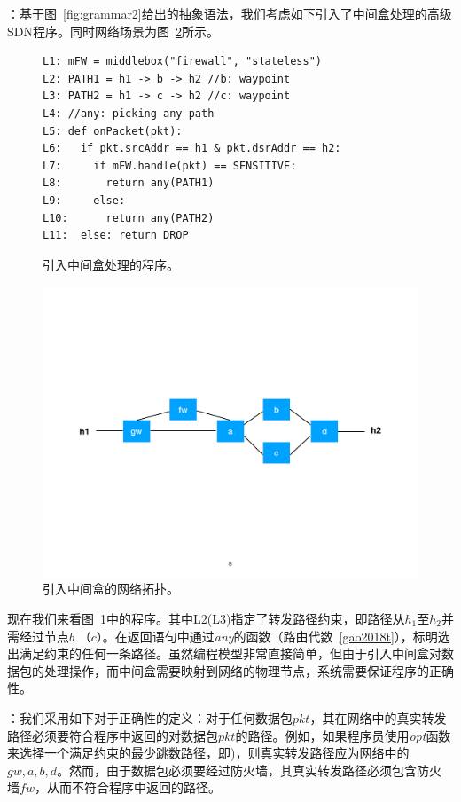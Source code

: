 ：基于图~\ref{fig:grammar2}给出的抽象语法，我们考虑如下引入了中间盒处理的高级SDN程序。同时网络场景为图~\ref{fig:topo2}所示。

\begin{figure}[h]
\begin{verbatim}
L1: mFW = middlebox("firewall", "stateless")
L2: PATH1 = h1 -> b -> h2 //b: waypoint
L3: PATH2 = h1 -> c -> h2 //c: waypoint
L4: //any: picking any path
L5: def onPacket(pkt):
L6:   if pkt.srcAddr == h1 & pkt.dsrAddr == h2:
L7:     if mFW.handle(pkt) == SENSITIVE:
L8:       return any(PATH1)
L9:     else:
L10:      return any(PATH2)
L11:  else: return DROP
\end{verbatim}
    \caption{\small 引入中间盒处理的程序。}
\label{fig:code2}
\end{figure}


\begin{figure}[!htbp]
\includegraphics[width=0.8\linewidth]{figures/global-topo2.pdf}
\centering
\caption{\small 引入中间盒的网络拓扑。}
\label{fig:topo2}
\end{figure}

现在我们来看图~\ref{fig:code2}中的程序。其中L2(L3)指定了转发路径约束，即路径从$h_1$至$h_2$并需经过节点$b$ （$c$）。在返回语句中通过\emph{any}的函数（路由代数~\ref{gao2018t}），标明选出满足约束的任何一条路径。虽然编程模型非常直接简单，但由于引入中间盒对数据包的处理操作，而中间盒需要映射到网络的物理节点，系统需要保证程序的正确性。

：我们采用如下对于正确性的定义：对于任何数据包$pkt$，其在网络中的真实转发路径必须要符合程序中返回的对数据包$pkt$的路径。例如，如果程序员使用\emph{opt}函数来选择一个满足约束的最少跳数路径，即)，则真实转发路径应为网络中的$gw, a, b, d$。然而，由于数据包必须要经过防火墙，其真实转发路径必须包含防火墙$fw$，从而不符合程序中返回的路径。

